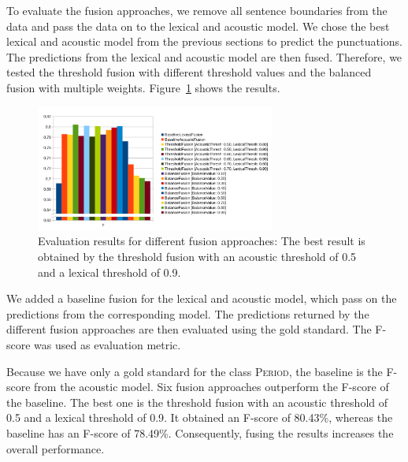 To evaluate the fusion approaches, we remove all sentence boundaries from the data and pass the data on to the lexical and acoustic model.
We chose the best lexical and acoustic model from the previous sections to predict the punctuations.
The predictions from the lexical and acoustic model are then fused.
Therefore, we tested the threshold fusion with different threshold values and the balanced fusion with multiple weights.
Figure~\ref{fig:eval_fusion} shows the results.
\begin{figure}[ht]
    \centering
    \includegraphics[width=0.7\textwidth]{img/fusion_eval.pdf}
    \caption{Evaluation results for different fusion approaches: The best result is obtained by the threshold fusion with an acoustic threshold of 0.5 and a lexical threshold of 0.9.}
    \label{fig:eval_fusion}
\end{figure}
We added a baseline fusion for the lexical and acoustic model, which pass on the predictions from the corresponding model.
The predictions returned by the different fusion approaches are then evaluated using the gold standard.
The F-score was used as evaluation metric.

Because we have only a gold standard for the class \textsc{Period}, the baseline is the F-score from the acoustic model.
Six fusion approaches outperform the F-score of the baseline.
The best one is the threshold fusion with an acoustic threshold of 0.5 and a lexical threshold of 0.9.
It obtained an F-score of 80.43\%, whereas the baseline has an F-score of 78.49\%.
Consequently, fusing the results increases the overall performance.
